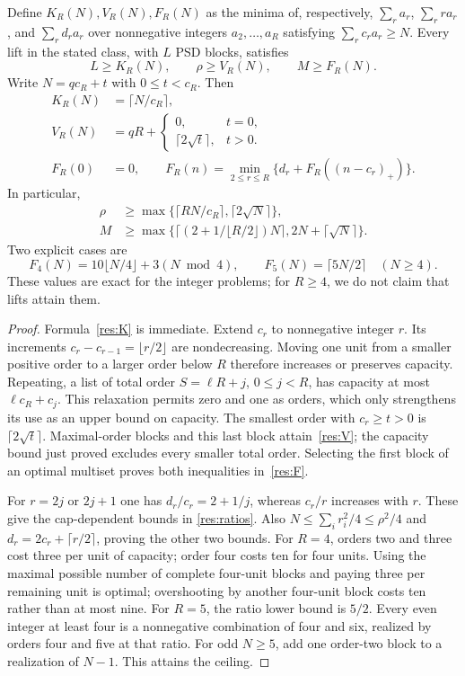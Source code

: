 \begin{proposition}\label{res:integer}
Define $K_R(N),V_R(N),F_R(N)$ as the minima of, respectively,
$\sum_r a_r$, $\sum_r ra_r$, and $\sum_r d_ra_r$ over nonnegative
integers $a_2,\ldots,a_R$ satisfying $\sum_r c_ra_r\geq N$.
Every lift in the stated class, with $L$ PSD blocks, satisfies
\[
 L\geq K_R(N),\qquad \rho\geq V_R(N),\qquad M\geq F_R(N).
\]
Write $N=qc_R+t$ with $0\leq t<c_R$. Then
\begin{align}
 K_R(N)&=\lceil N/c_R\rceil,\label{res:K}\\
 V_R(N)&=qR+\begin{cases}0,&t=0,\\\lceil2\sqrt t\rceil,&t>0.\end{cases}
 \label{res:V}\\
 F_R(0)&=0,\qquad
 F_R(n)=\min_{2\leq r\leq R}\{d_r+F_R((n-c_r)_+)\}.
 \label{res:F}
\end{align}
In particular,
\begin{align}
 \rho&\geq\max\{\lceil RN/c_R\rceil,\lceil2\sqrt N\rceil\},\nonumber\\
 M&\geq\max\{\lceil(2+1/\lfloor R/2\rfloor)N\rceil,
                       2N+\lceil\sqrt N\rceil\}.\label{res:ratios}
\end{align}
Two explicit cases are
\[
 F_4(N)=10\lfloor N/4\rfloor+3(N\bmod4),\qquad
 F_5(N)=\lceil5N/2\rceil\quad(N\geq4).
\]
These values are exact for the integer problems; for $R\geq4$, we do not
claim that lifts attain them.
\end{proposition}
\begin{proof}
Formula~\eqref{res:K} is immediate. Extend $c_r$ to nonnegative integer $r$.
Its increments $c_r-c_{r-1}=\lfloor r/2\rfloor$ are nondecreasing.
Moving one unit from a smaller positive order to a larger order below $R$
therefore increases or preserves capacity. Repeating, a list of total
order $S=\ell R+j$, $0\leq j<R$, has capacity at most
$\ell c_R+c_j$. This relaxation permits zero and one as orders, which
only strengthens its use as an upper bound on capacity. The smallest
order with $c_r\geq t>0$ is $\lceil2\sqrt t\rceil$. Maximal-order blocks
and this last block attain~\eqref{res:V}; the capacity bound just proved
excludes every smaller total order. Selecting the first block of an
optimal multiset proves both inequalities in~\eqref{res:F}.

For $r=2j$ or $2j+1$ one has $d_r/c_r=2+1/j$, whereas $c_r/r$
increases with $r$. These give the cap-dependent bounds in
\eqref{res:ratios}. Also
$N\leq\sum_i r_i^2/4\leq\rho^2/4$ and
$d_r=2c_r+\lceil r/2\rceil$, proving the other two bounds.
For $R=4$, orders two and three cost three per unit of capacity;
order four costs ten for four units. Using the maximal possible number
of complete four-unit blocks and paying three per remaining unit is
optimal; overshooting by another four-unit block costs ten rather than
at most nine. For $R=5$, the ratio lower bound is $5/2$. Every even
integer at least four is a nonnegative combination of four and six,
realized by orders four and five at that ratio. For odd $N\geq5$, add
one order-two block to a realization of $N-1$. This attains the ceiling.
\end{proof}


